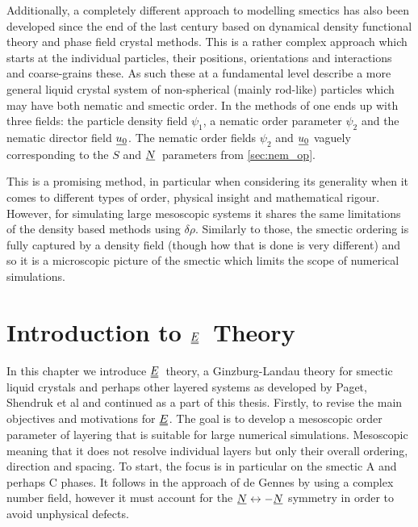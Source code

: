 \documentclass[12pt]{article}
\newcommand{\suf}[2]{\stackunder[0.5pt]{\stackunder[1pt]{\ensuremath{#1}}{\rule{\widthof{\ensuremath{#2}}*\real{0.9}}{.1ex}}}{}}
\newcommand{\duf}[2]{\stackunder[0.5pt]{\stackunder[0.8pt]{\stackunder[1pt]{\ensuremath{#1}}{\rule{\widthof{\ensuremath{#2}}*\real{0.9}}{.1ex}}}{\rule{\widthof{\ensuremath{#2}}*\real{0.9}}{.1ex}}}{}}
\newcommand{\su}[1]{\suf{#1}{#1}}
\newcommand{\du}[1]{\duf{#1}{#1}}
\newcommand{\NN}{\ensuremath{\su{N}}}
\newcommand{\EE}{\ensuremath{\du{E}}}
\begin{document}
        Additionally, a completely different approach to modelling smectics has also been developed since the end of the last century based on dynamical density functional theory and phase field crystal methods\cite{lowenPhasefieldcrystalModelLiquid2010,elderModelingElasticPlastic2004,achimStabilityLiquidCrystalline2011,vitralPhasefieldModelWeakly2021,nestlerActiveSmecticsSphere2023}.
        This is a rather complex approach which starts at the individual particles, their positions, orientations and interactions and coarse-grains these.
        As such these at a fundamental level describe a more general liquid crystal system of non-spherical (mainly rod-like) particles which may have both nematic and smectic order.
        In the methods of \cite{lowenPhasefieldcrystalModelLiquid2010} one ends up with three fields: the particle density field $\psi_1$, a nematic order parameter $\psi_2$ and the nematic director field $\su{u_0}$.
        The nematic order fields $\psi_2$ and $\su{u_0}$ vaguely corresponding to the $S$ and \NN\ parameters from \cref{sec:nem_op}.

        This is a promising method, in particular when considering its generality when it comes to different types of order, physical insight and mathematical rigour.
        However, for simulating large mesoscopic systems it shares the same limitations of the density based methods using $\delta\rho$.
        Similarly to those, the smectic ordering is fully captured by a density field (though how that is done is very different) and so it is a microscopic picture of the smectic which limits the scope of numerical simulations.


\section{Introduction to \EE\ Theory}\label{sec:Eintro}
    In this chapter we introduce \EE\ theory, a Ginzburg-Landau theory for smectic liquid crystals and perhaps other layered systems as developed by Paget, Shendruk et al\cite{pagetComplexTensorsSimple2023,pagetSmecticLayeringLandau2022,pagetComplextensorTheorySimple2023} and continued as a part of this thesis.
    Firstly, to revise the main objectives and motivations for \EE.
    The goal is to develop a mesoscopic order parameter of layering that is suitable for large numerical simulations.
    Mesoscopic meaning that it does not resolve individual layers but only their overall ordering, direction and spacing.
    To start, the focus is in particular on the smectic A and perhaps C phases.
    It follows in the approach of de Gennes by using a complex number field, however it must account for the $\su{N} \leftrightarrow -\su{N}$ symmetry in order to avoid unphysical defects.
\end{document}
